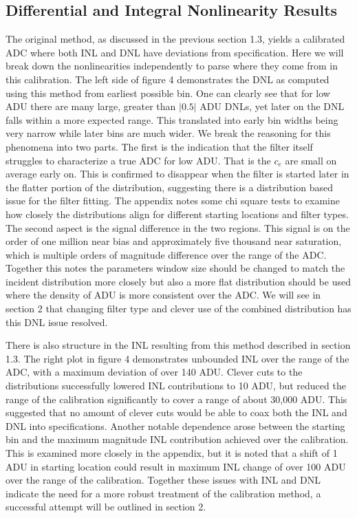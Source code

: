 \documentclass[11pt, letterpaper]{article}
\begin{document}
\subsection{Differential and Integral Nonlinearity Results}
\indent


The original method, as discussed in the previous section 1.3, yields a calibrated ADC where both INL and DNL have deviations from specification. 
Here we will break down the nonlinearities independently to parse where they come from in this calibration. 
The left side of figure 4 demonstrates the DNL as computed using this method from earliest possible bin. 
One can clearly see that for low ADU there are many large, greater than $|0.5|$ ADU DNLs, yet later on the DNL falls within a more expected range. 
This translated into early bin widths being very narrow while later bins are much wider. 
We break the reasoning for this phenomena into two parts. 
The first is the indication that the filter itself struggles to characterize a true ADC for low ADU.
That is the $c_{e}$ are small on average early on. 
This is confirmed to disappear when the filter is started later in the flatter portion of the distribution, suggesting there is a distribution based issue for the filter fitting. 
The appendix notes some chi square tests to examine how closely the distributions align for different starting locations and filter types. 
The second aspect is the signal difference in the two regions. 
This signal is on the order of one million near bias and approximately five thousand near saturation, which is multiple orders of magnitude difference over the range of the ADC.
Together this notes the parameters window size should be changed to match the incident distribution more closely but also a more flat distribution should be used where the density of ADU is more consistent over the ADC.
We will see in section 2 that changing filter type and clever use of the combined distribution has this DNL issue resolved. 
\indent 


There is also structure in the INL resulting from this method described in section 1.3.
The right plot in figure 4 demonstrates unbounded INL over the range of the ADC, with a maximum deviation of over 140 ADU. 
Clever cuts to the distributions successfully lowered INL contributions to 10 ADU, but reduced the range of the calibration significantly to cover a range of about 30,000 ADU. 
This suggested that no amount of clever cuts would be able to coax both the INL and DNL into specifications. 
Another notable dependence arose between the starting bin and the maximum magnitude INL contribution achieved over the calibration. 
This is examined more closely in the appendix, but it is noted that a shift of 1 ADU in starting location could result in maximum INL change of over 100 ADU over the range of the calibration. 
Together these issues with INL and DNL indicate the need for a more robust treatment of the calibration method, a successful attempt will be outlined in section 2.
\end{document}
